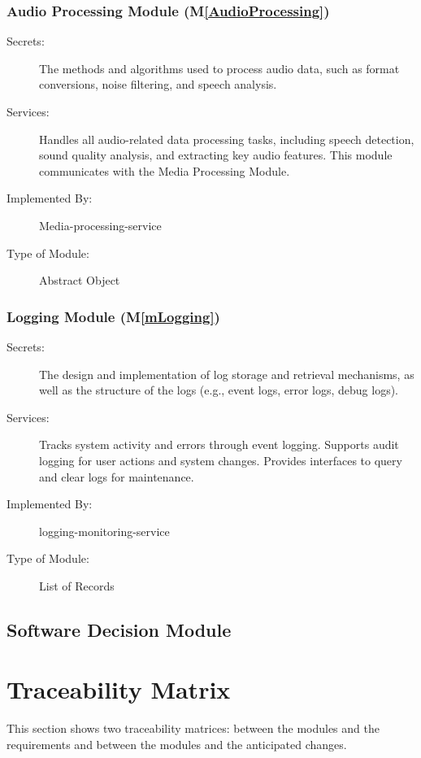 \documentclass[12pt, titlepage]{article}
\newcommand{\mref}[1]{M\ref{#1}}
\begin{document}
\subsubsection{Audio Processing Module (\mref{AudioProcessing})}
\begin{description}
\item[Secrets:] The methods and algorithms used to process audio data, such as format conversions, noise filtering, and speech analysis.
\item[Services:] Handles all audio-related data processing tasks, including speech detection, sound quality analysis, and extracting key audio features. This module communicates with the Media Processing Module.
\item[Implemented By:] Media-processing-service
\item[Type of Module:] Abstract Object
\end{description}

\subsubsection{Logging Module (\mref{mLogging})}
\begin{description}
\item[Secrets:] The design and implementation of log storage and retrieval mechanisms, as well as the structure of the logs (e.g., event logs, error logs, debug logs).
\item[Services:] Tracks system activity and errors through event logging. Supports audit logging for user actions and system changes.
Provides interfaces to query and clear logs for maintenance.
\item[Implemented By:] logging-monitoring-service
\item[Type of Module:] List of Records
\end{description}

\subsection{Software Decision Module}

\section{Traceability Matrix} \label{SecTM}

This section shows two traceability matrices: between the modules and the
requirements and between the modules and the anticipated changes.
\end{document}
